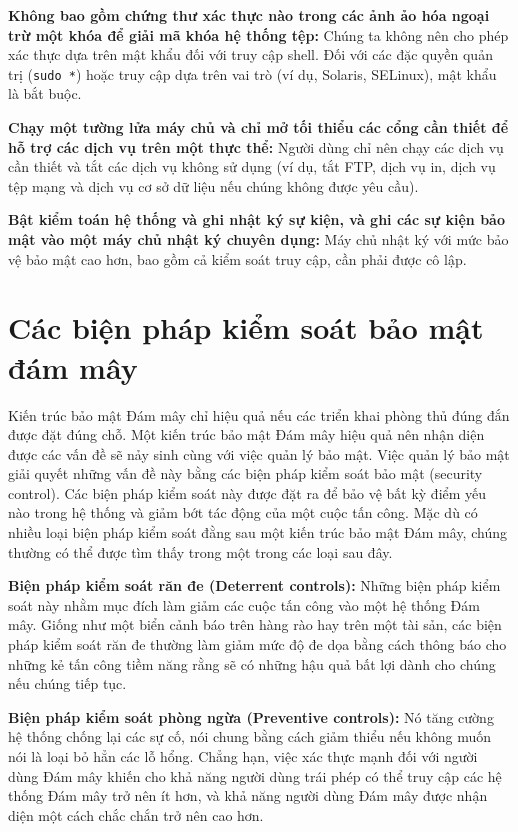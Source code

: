 \textbf{Không bao gồm chứng thư xác thực nào trong các ảnh ảo hóa ngoại trừ một khóa để giải mã khóa hệ thống tệp:} Chúng ta không nên cho phép xác thực dựa trên mật khẩu đối với truy cập shell. Đối với các đặc quyền quản trị (\texttt{sudo *}) hoặc truy cập dựa trên vai trò (ví dụ, Solaris, SELinux), mật khẩu là bắt buộc.

\textbf{Chạy một tường lửa máy chủ và chỉ mở tối thiểu các cổng cần thiết để hỗ trợ các dịch vụ trên một thực thể:} Người dùng chỉ nên chạy các dịch vụ cần thiết và tắt các dịch vụ không sử dụng (ví dụ, tắt FTP, dịch vụ in, dịch vụ tệp mạng và dịch vụ cơ sở dữ liệu nếu chúng không được yêu cầu).

\textbf{Bật kiểm toán hệ thống và ghi nhật ký sự kiện, và ghi các sự kiện bảo mật vào một máy chủ nhật ký chuyên dụng:} Máy chủ nhật ký với mức bảo vệ bảo mật cao hơn, bao gồm cả kiểm soát truy cập, cần phải được cô lập.

\section{Các biện pháp kiểm soát bảo mật đám mây}

Kiến trúc bảo mật Đám mây chỉ hiệu quả nếu các triển khai phòng thủ đúng đắn được đặt đúng chỗ. Một kiến trúc bảo mật Đám mây hiệu quả nên nhận diện được các vấn đề sẽ nảy sinh cùng với việc quản lý bảo mật. Việc quản lý bảo mật giải quyết những vấn đề này bằng các biện pháp kiểm soát bảo mật (security control). Các biện pháp kiểm soát này được đặt ra để bảo vệ bất kỳ điểm yếu nào trong hệ thống và giảm bớt tác động của một cuộc tấn công. Mặc dù có nhiều loại biện pháp kiểm soát đằng sau một kiến trúc bảo mật Đám mây, chúng thường có thể được tìm thấy trong một trong các loại sau đây.

\textbf{Biện pháp kiểm soát răn đe (Deterrent controls):} Những biện pháp kiểm soát này nhằm mục đích làm giảm các cuộc tấn công vào một hệ thống Đám mây. Giống như một biển cảnh báo trên hàng rào hay trên một tài sản, các biện pháp kiểm soát răn đe thường làm giảm mức độ đe dọa bằng cách thông báo cho những kẻ tấn công tiềm năng rằng sẽ có những hậu quả bất lợi dành cho chúng nếu chúng tiếp tục.

\textbf{Biện pháp kiểm soát phòng ngừa (Preventive controls):} Nó tăng cường hệ thống chống lại các sự cố, nói chung bằng cách giảm thiểu nếu không muốn nói là loại bỏ hẳn các lỗ hổng. Chẳng hạn, việc xác thực mạnh đối với người dùng Đám mây khiến cho khả năng người dùng trái phép có thể truy cập các hệ thống Đám mây trở nên ít hơn, và khả năng người dùng Đám mây được nhận diện một cách chắc chắn trở nên cao hơn.

